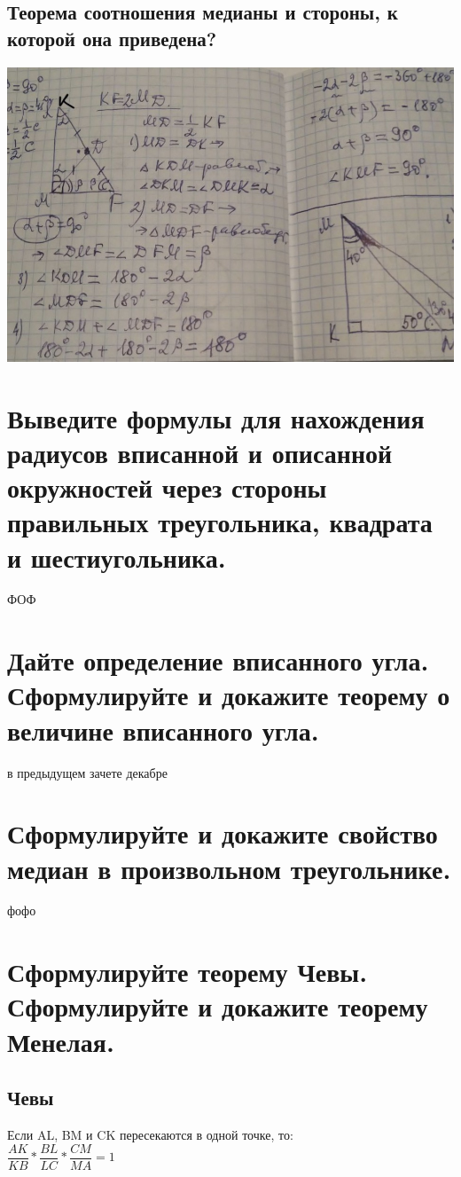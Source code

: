 \documentclass[12pt, letterpaper]{article}
\begin{document}
\subsection{Теорема соотношения медианы и стороны, к которой она приведена?}
\includegraphics[scale=0.3]{photo9.jpg} \\

\section {Выведите формулы для нахождения радиусов вписанной и описанной окружностей через стороны правильных треугольника, квадрата и шестиугольника.}
ФОФ
\section {Дайте определение вписанного угла. Сформулируйте и докажите теорему о величине вписанного угла.}
в предыдущем зачете декабре
\section {Сформулируйте и докажите свойство медиан в произвольном треугольнике.}
фофо

\section {Сформулируйте теорему Чевы. Сформулируйте и докажите теорему Менелая.}
\subsection{Чевы}
Если AL, BM и CK пересекаются в одной точке, то: \\
$\dfrac{AK}{KB}*\dfrac{BL}{LC}*\dfrac{CM}{MA}=1$\\
\end{document}
